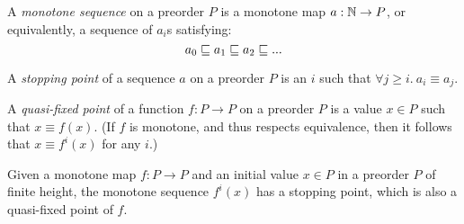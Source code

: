 \documentclass{article}
\newcommand{\eqposet}[1]{\ms{Eq}(#1)}
\renewcommand{\eqposet}[1]{\|{#1}\|}
\newcommand{\eqclass}[1]{[#1]}
\newcommand{\height}{\ms{height}}
\newcommand{\elemheight}[2]{\height(#2 : #1)}
\newcommand{\down}[2]{\mathop{\downarrow}(#2 : #1)}
\begin{document}


\begin{definition}
  A \emph{monotone sequence} on a preorder $P$ is a monotone map $a : \mathbb{N} \to P$,
  or equivalently, a sequence of $a_i$s satisfying:
  \[ a_0 \sqsubseteq a_1 \sqsubseteq a_2 \sqsubseteq ... \]
\end{definition}

\begin{definition}
  A \emph{stopping point} of a sequence $a$ on a preorder $P$ is an $i$ such
  that \(\forall j \ge i.\ a_i \equiv a_j\).
\end{definition}

\begin{definition}
  A \emph{quasi-fixed point} of a function $f : P \to P$ on a preorder $P$ is a
  value $x \in P$ such that $x \equiv f(x)$. (If $f$ is monotone, and thus
  respects equivalence, then it follows that $x \equiv f^i(x)$ for any $i$.)
\end{definition}

\begin{theorem}\label{thm:finiteheight-quasifixed}
  Given a monotone map $f : P \to P$ and an initial value $x \in P$ in a
  preorder $P$ of finite height, the monotone sequence $f^i(x)$ has a stopping
  point, which is also a quasi-fixed point of $f$.
\end{theorem}
\end{document}
